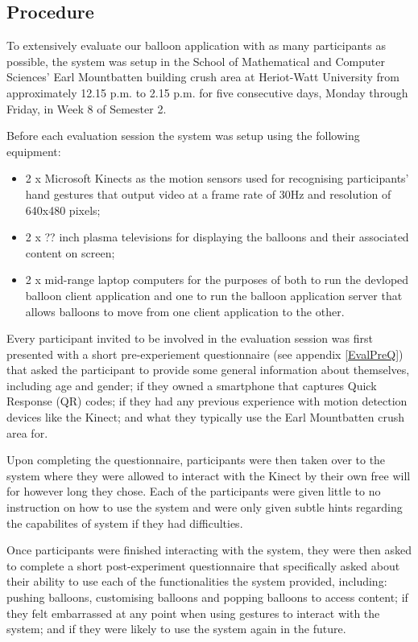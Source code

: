 \subsection{Procedure}

To extensively evaluate our balloon application with as many participants as possible, the system was setup in the School of Mathematical and Computer Sciences'  Earl Mountbatten building crush area at Heriot-Watt University from approximately 12.15 p.m. to 2.15 p.m. for five consecutive days, Monday through Friday, in Week 8 of Semester 2.

Before each evaluation session the system was setup using the following equipment:
\begin{itemize}
\item{2 x Microsoft Kinects as the motion sensors used for recognising participants' hand gestures that output video at a frame rate of 30Hz and resolution of 640x480 pixels;}
\item{2 x ?? inch plasma televisions for displaying the balloons and their associated content on screen; }
\item{2 x mid-range laptop computers for the purposes of both to run the devloped balloon client application and one to run the balloon application server that allows balloons to move from one client application to the other.}
\end{itemize}

Every participant invited to be involved in the evaluation session was first presented with a short pre-experiement questionnaire (see appendix \vref{EvalPreQ}) that asked the participant to provide some general information about themselves, including age and gender; if they owned a smartphone that captures Quick Response (QR) codes; if they had any previous experience with motion detection devices like the Kinect; and what they typically use the Earl Mountbatten crush area for.

Upon completing the questionnaire, participants were then taken over to the system where they were allowed to interact with the Kinect by their own free will for however long they chose. Each of the participants were given little to no instruction on how to use the system and were only given subtle hints regarding the capabilites of system if they had difficulties.

Once participants were finished interacting with the system, they were then asked to complete a short post-experiment questionnaire that specifically asked about their ability to use each of the functionalities the system provided, including: pushing balloons, customising balloons and popping balloons to access content; if they felt embarrassed at any point when using gestures to interact with the system; and if they were likely to use the system again in the future.

